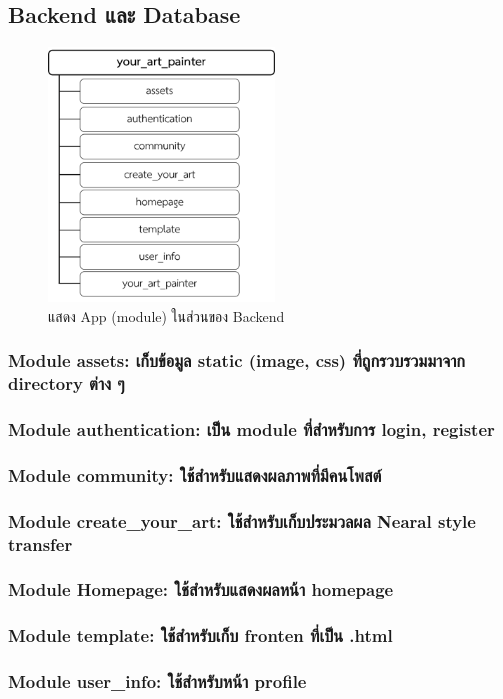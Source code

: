 \documentclass[12pt,oneside,openright,a4paper]{cpe-thai-project}
\begin{document}
\newpage
\subsection{Backend และ Database}
\begin{figure}[!h]
  \centering
  \includegraphics[width=6cm]{./image/app_module.png}
  \caption{แสดง App (module) ในส่วนของ Backend}
  \label{fig:app_module}
\end{figure}

\subsubsection{Module assets: เก็บข้อมูล static (image, css) ที่ถูกรวบรวมมาจาก directory ต่าง ๆ}
\subsubsection{Module authentication: เป็น module ที่สำหรับการ login, register}
\subsubsection{Module community: ใช้สำหรับแสดงผลภาพที่มีคนโพสต์}
\subsubsection{Module create\_your\_art: ใช้สำหรับเก็บประมวลผล Nearal style transfer}
\subsubsection{Module Homepage: ใช้สำหรับแสดงผลหน้า homepage}
\subsubsection{Module template: ใช้สำหรับเก็บ fronten ที่เป็น .html}
\subsubsection{Module user\_info:  ใช้สำหรับหน้า profile}
\end{document}
